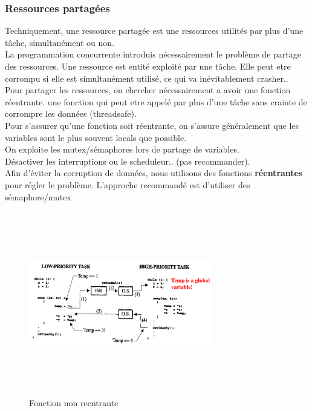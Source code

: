 \documentclass[oneside]{book}
\begin{document}
    \subsubsection{Ressources partagées}
    Techniquement, une ressource partagée est une ressources utilités par plus d'une tâche, simultanément ou non.\\
    
    
    La programmation concurrente introduis nécessairement le problème de partage des ressources. Une ressource est entité exploité par une tâche. Elle peut etre corrompu si elle est simultanément utilisé, ce qui va inévitablement crasher.. \\
    
    Pour partager les ressources, on chercher nécessairement a avoir une fonction réentrante. une fonction qui peut etre appelé par plus d'une tâche sans crainte de corrompre les données (threadsafe).\\
    
    Pour s'assurer qu'une fonction soit réentrante, on s'assure généralement que les variables sont le plus souvent locals que possible.\\
    
    On exploite les mutex/sémaphores lors de partage de variables.\\
    
    Désactiver les interruptions ou le scheduleur.. (pas recommander).\\
    
    Afin d'éviter la corruption de données, nous utilisons des fonctions \textbf{réentrantes} pour régler le problème. L'approche recommandé est d'utiliser des sémaphore/mutex\\
    

    \begin{figure}[!ht]
    	\centering
    	\includegraphics[width=8cm, height = 8cm, keepaspectratio]{Images/fonction_non_reentrante.png}
    	\caption{Fonction non reentrante}
    	\label{fig:FonctionNonReentrante}
    \end{figure}
\end{document}
